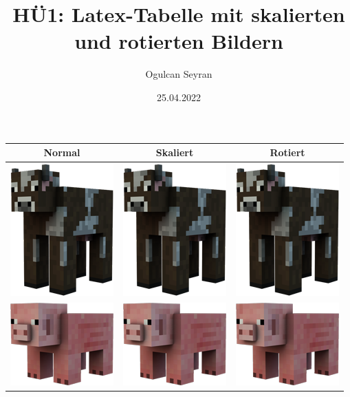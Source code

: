 \documentclass{article}
\title{HÜ1: Latex-Tabelle mit skalierten und rotierten Bildern}
\author{Ogulcan Seyran}
\date{25.04.2022}
\begin{document}
	\maketitle
	\begin{center}
		\begin{tabular}{ |c |c |c| }
			\hline
			Normal & Skaliert & Rotiert \\
			\hline
			\includegraphics[scale=0.3]{cow.png} & \includegraphics[scale=0.15]{cow.png} & \includegraphics[scale=0.3,angle=45]{cow.png} \\ 
			\hline
			\includegraphics[scale=0.3]{pig.png} & \includegraphics[scale=0.15]{pig.png} & \includegraphics[scale=0.3,angle=15]{pig.png} \\ 

\end{tabular}
\end{center}
\end{document}
